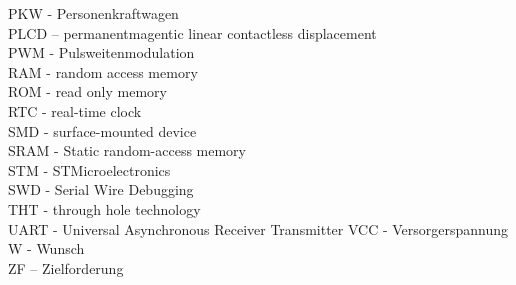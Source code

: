 PKW - Personenkraftwagen\\
PLCD – permanentmagentic linear contactless displacement\\
PWM - Pulsweitenmodulation\\ 
RAM - random access memory\\
ROM - read only memory\\
RTC - real-time clock\\
SMD - surface-mounted device\\
SRAM - Static random-access memory\\
STM - STMicroelectronics\\
SWD - Serial Wire Debugging\\
THT - through hole technology\\
UART - Universal Asynchronous Receiver Transmitter
VCC - Versorgerspannung
W - Wunsch\\
ZF – Zielforderung\\
